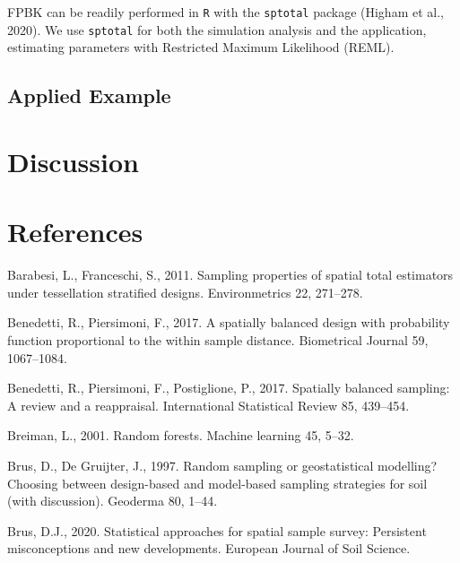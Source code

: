 \documentclass[]{elsarticle} %
\begin{document}
FPBK can be readily performed in \texttt{R} with the \texttt{sptotal}
package (Higham et al., 2020). We use \texttt{sptotal} for both the
simulation analysis and the application, estimating parameters with
Restricted Maximum Likelihood (REML).

\hypertarget{applied-example}{%
\subsection{Applied Example}\label{applied-example}}

\hypertarget{sec:discussion}{%
\section{Discussion}\label{sec:discussion}}

\hypertarget{references}{%
\section*{References}\label{references}}

\hypertarget{refs}{}
\leavevmode\hypertarget{ref-barabesi2011sampling}{}%
Barabesi, L., Franceschi, S., 2011. Sampling properties of spatial total
estimators under tessellation stratified designs. Environmetrics 22,
271--278.

\leavevmode\hypertarget{ref-benedetti2017spatially}{}%
Benedetti, R., Piersimoni, F., 2017. A spatially balanced design with
probability function proportional to the within sample distance.
Biometrical Journal 59, 1067--1084.

\leavevmode\hypertarget{ref-benedetti2017spatiallyreview}{}%
Benedetti, R., Piersimoni, F., Postiglione, P., 2017. Spatially balanced
sampling: A review and a reappraisal. International Statistical Review
85, 439--454.

\leavevmode\hypertarget{ref-breiman2001random}{}%
Breiman, L., 2001. Random forests. Machine learning 45, 5--32.

\leavevmode\hypertarget{ref-brus1997random}{}%
Brus, D., De Gruijter, J., 1997. Random sampling or geostatistical
modelling? Choosing between design-based and model-based sampling
strategies for soil (with discussion). Geoderma 80, 1--44.

\leavevmode\hypertarget{ref-brus2020statistical}{}%
Brus, D.J., 2020. Statistical approaches for spatial sample survey:
Persistent misconceptions and new developments. European Journal of Soil
Science.
\end{document}
